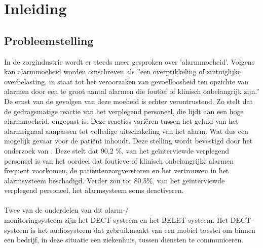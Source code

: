 


% 

\section{Inleiding}%
\label{sec:inleiding}

\subsection{Probleemstelling}

In de zorgindustrie wordt er steeds meer gesproken over 'alarmmoeheid'. Volgens \textcite{Ferrara2023} kan alarmmoeheid worden omschreven als ''een overprikkeling of zintuiglijke overbelasting, in staat tot het veroorzaken van gevoelloosheid ten opzichte van alarmen door een te groot aantal alarmen die foutief of klinisch onbelangrijk zijn.'' De ernst van de gevolgen van deze moeheid is echter verontrustend. Zo stelt \textcite{Ferrara2023} dat de gedragsmatige reactie van het verplegend personeel, die lijdt aan een hoge alarmmoeheid, ongepast is. Deze reacties variëren tussen het geluid van het alarmsignaal aanpassen tot volledige uitschakeling van het alarm. Wat dus een mogelijk gevaar voor de patiënt  inhoudt. Deze stelling wordt bevestigd door het onderzoek van \textcite{Casey2018}. Deze stelt dat 90,2 \%, van het geïnterviewde verplegend personeel is van het oordeel dat foutieve of klinisch onbelangrijke alarmen frequent voorkomen, de patiëntenzorgverstoren en het vertrouwen in het alarmsysteem beschadigd. Verder zou tot 80,5\%, van het geïnterviewde  verplegend personeel, het alarmsysteem soms deactiveren.
\\\\
Twee van de onderdelen van dit alarm-/\\monitoringsysteem zijn het DECT-systeem en het BELET-systeem. Het DECT-systeem is het audiosysteem dat gebruikmaakt van een mobiel toestel om binnen een bedrijf, in deze situatie een ziekenhuis, tussen diensten te communiceren. 

